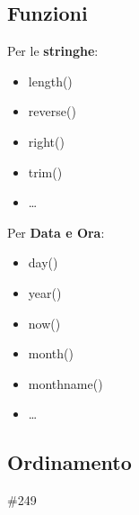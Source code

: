 \documentclass[12pt,a4paper]{article}
\begin{document}
\subsection{Funzioni}
Per le \textbf{stringhe}:
\begin{itemize}
\item length()
\item reverse()
\item right()
\item trim()
\item \dots
\end{itemize}
Per \textbf{Data e Ora}:
\begin{itemize}
\item day()
\item year()
\item now()
\item month()
\item monthname()
\item \dots
\end{itemize}

\subsection{Ordinamento}
\#249


\end{document}
